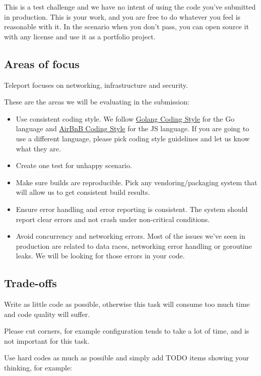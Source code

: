 \documentclass{article}
\begin{document}
This is a test challenge and we have no intent of using the code you've submitted in production.
This is your work, and you are free to do whatever you feel is reasonable with it.
In the scenario when you don't pass, you can open source it with any license and use it as a portfolio project.

\subsection{Areas of focus}

Teleport focuses on networking, infrastructure and security.

These are the areas we will be evaluating in the submission:

  \begin{itemize}
  \item Use consistent coding style. We follow \href{https://github.com/golang/go/wiki/CodeReviewComments}{Golang Coding Style} for the Go language and \href{https://github.com/airbnb/javascript}{AirBnB Coding Style} for the JS language. If you are going to use a different language, please pick coding style guidelines and let us know what they are.
  \item Create one test for unhappy scenario.
  \item Make sure builds are reproducible. Pick any vendoring/packaging system that will allow us to get consistent build results.
  \item Ensure error handling and error reporting is consistent. The system should report clear errors and not crash under non-critical conditions.
  \item Avoid concurrency and networking errors. Most of the issues we've seen in production are related to data races, networking error handling or goroutine leaks. We will be looking for those errors in your code.
  \end{itemize}

\subsection{Trade-offs}

Write as little code as possible, otherwise this task will consume too much time and code quality will suffer.

Please cut corners, for example configuration tends to take a lot of time, and is not important for this task.

Use hard codes as much as possible and simply add TODO items showing your thinking, for example:
\end{document}

